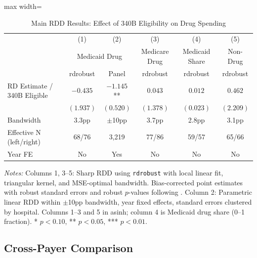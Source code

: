 \documentclass[12pt]{article}
\begin{document}
\begin{table}[H]
\centering
\caption{Main RDD Results: Effect of 340B Eligibility on Drug Spending}
\label{tab:main_rdd}
\begin{adjustbox}{max width=\textwidth}
\begin{threeparttable}
\begin{tabular}{lccccc}
\toprule
& (1) & (2) & (3) & (4) & (5) \\
& \multicolumn{2}{c}{Medicaid Drug} & Medicare Drug & Medicaid Share & Non-Drug \\
& rdrobust & Panel & rdrobust & rdrobust & rdrobust \\
\midrule
RD Estimate / 340B Eligible & $-0.435$ & $-1.145$** & $0.043$ & $0.012$ & $0.462$ \\
& $(1.937)$ & $(0.520)$ & $(1.378)$ & $(0.023)$ & $(2.209)$ \\[6pt]
Bandwidth & 3.3pp & $\pm$10pp & 3.7pp & 2.8pp & 3.1pp \\
Effective N (left/right) & 68/76 & \multicolumn{1}{c}{3,219} & 77/86 & 59/57 & 65/66 \\
Year FE & No & Yes & No & No & No \\
\bottomrule
\end{tabular}
\begin{tablenotes}[flushleft]
\small
\item \textit{Notes:} Columns 1, 3--5: Sharp RDD using \texttt{rdrobust} with local linear fit, triangular kernel, and MSE-optimal bandwidth. Bias-corrected point estimates with robust standard errors and robust $p$-values following \citet{calonico2014robust}. Column 2: Parametric linear RDD within $\pm$10pp bandwidth, year fixed effects, standard errors clustered by hospital. Columns 1--3 and 5 in asinh; column 4 is Medicaid drug share (0--1 fraction). * $p<0.10$, ** $p<0.05$, *** $p<0.01$.
\end{tablenotes}
\end{threeparttable}
\end{adjustbox}
\end{table}


\subsection{Cross-Payer Comparison}
\end{document}
